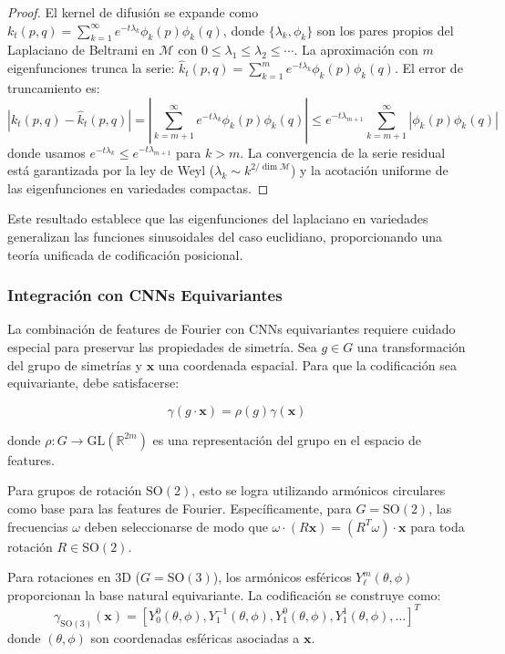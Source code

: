 \begin{proof}
El kernel de difusión se expande como $k_t(p,q) = \sum_{k=1}^{\infty} e^{-t\lambda_k} \phi_k(p) \phi_k(q)$, donde $\{\lambda_k, \phi_k\}$ son los pares propios del Laplaciano de Beltrami en $\mathcal{M}$ con $0 \leq \lambda_1 \leq \lambda_2 \leq \cdots$. La aproximación con $m$ eigenfunciones trunca la serie: $\hat{k}_t(p,q) = \sum_{k=1}^{m} e^{-t\lambda_k} \phi_k(p) \phi_k(q)$. El error de truncamiento es:
\[
|k_t(p,q) - \hat{k}_t(p,q)| = \left|\sum_{k=m+1}^{\infty} e^{-t\lambda_k} \phi_k(p) \phi_k(q)\right| \leq e^{-t\lambda_{m+1}} \sum_{k=m+1}^{\infty} |\phi_k(p) \phi_k(q)|
\]
donde usamos $e^{-t\lambda_k} \leq e^{-t\lambda_{m+1}}$ para $k > m$. La convergencia de la serie residual está garantizada por la ley de Weyl ($\lambda_k \sim k^{2/\dim \mathcal{M}}$) y la acotación uniforme de las eigenfunciones en variedades compactas.
\end{proof}

Este resultado establece que las eigenfunciones del laplaciano en variedades generalizan las funciones sinusoidales del caso euclidiano, proporcionando una teoría unificada de codificación posicional.

\subsubsection{Integración con CNNs Equivariantes}

La combinación de features de Fourier con CNNs equivariantes requiere cuidado especial para preservar las propiedades de simetría. Sea $g \in G$ una transformación del grupo de simetrías y $\mathbf{x}$ una coordenada espacial. Para que la codificación sea equivariante, debe satisfacerse:

\begin{equation}
\gamma(g \cdot \mathbf{x}) = \rho(g) \gamma(\mathbf{x})
\end{equation}

donde $\rho: G \to \text{GL}(\mathbb{R}^{2m})$ es una representación del grupo en el espacio de features.

Para grupos de rotación $\text{SO}(2)$, esto se logra utilizando armónicos circulares como base para las features de Fourier. Específicamente, para $G = \text{SO}(2)$, las frecuencias $\omega$ deben seleccionarse de modo que $\omega \cdot (R\mathbf{x}) = (R^T\omega) \cdot \mathbf{x}$ para toda rotación $R \in \text{SO}(2)$.

Para rotaciones en 3D ($G = \text{SO}(3)$), los armónicos esféricos $Y_\ell^m(\theta, \phi)$ proporcionan la base natural equivariante. La codificación se construye como:
\begin{equation}
\gamma_{\text{SO}(3)}(\mathbf{x}) = [Y_0^0(\theta, \phi), Y_1^{-1}(\theta, \phi), Y_1^0(\theta, \phi), Y_1^1(\theta, \phi), \ldots]^T
\end{equation}
donde $(\theta, \phi)$ son coordenadas esféricas asociadas a $\mathbf{x}$.

